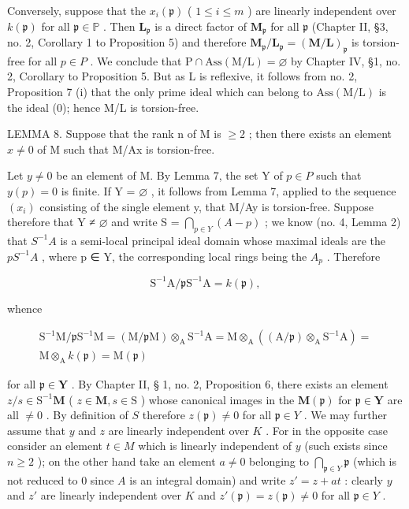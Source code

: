 Conversely, suppose that the \(x_{i}(\mathfrak{p})\) ( \(1 \leqslant i \leqslant m\) ) are linearly independent over \(k(\mathfrak{p})\) for all \(\mathfrak{p} \in \mathbb{P}\) . Then \(\mathbf{L}_{\mathfrak{p}}\) is a direct factor of \(\mathbf{M}_{\mathfrak{p}}\) for all \(\mathfrak{p}\) (Chapter II, §3, no. 2, Corollary 1 to Proposition 5) and therefore \(\mathbf{M}_{\mathfrak{p}} / \mathbf{L}_{\mathfrak{p}} = (\mathbf{M} / \mathbf{L})_{\mathfrak{p}}\) is torsion-free for all \(p \in P\) . We conclude that \(\mathrm{P} \cap \mathrm{Ass}(\mathrm{M}/\mathrm{L}) = \varnothing\) by Chapter IV, §1, no. 2, Corollary to Proposition 5. But as L is reflexive, it follows from no. 2, Proposition 7 (i) that the only prime ideal which can belong to \(\mathrm{Ass}(\mathrm{M}/\mathrm{L})\) is the ideal (0); hence M/L is torsion-free.

LEMMA 8. Suppose that the rank n of M is \(\geqslant2\) ; then there exists an element \(x \neq 0\) of M such that M/Ax is torsion-free.

Let \(y \neq 0\) be an element of M. By Lemma 7, the set Y of \(p \in P\) such that \(y(p) = 0\) is finite. If Y = \(\varnothing\) , it follows from Lemma 7, applied to the sequence \((x_i)\) consisting of the single element y, that M/Ay is torsion-free. Suppose therefore that Y ≠ \(\varnothing\) and write S = \(\bigcap_{p \in Y} (A - p)\) ; we know (no. 4, Lemma 2) that \(S^{-1}A\) is a semi-local principal ideal domain whose maximal ideals are the \(pS^{-1}A\) , where p ∈ Y, the corresponding local rings being the \(A_{p}\) . Therefore

\[
\mathrm{S} ^ {- 1} \mathrm{A} / \mathfrak {p} \mathrm{S} ^ {- 1} \mathrm{A} = k (\mathfrak {p}),
\]

whence

\[
\begin{array}{c} \mathrm{S} ^ {- 1} \mathrm{M} / \mathfrak {p} \mathrm{S} ^ {- 1} \mathrm{M} = (\mathrm{M} / \mathfrak {p} \mathrm{M}) \otimes_ {\mathrm{A}} \mathrm{S} ^ {- 1} \mathrm{A} = \mathrm{M} \otimes_ {\mathrm{A}} ((\mathrm{A} / \mathfrak {p}) \otimes_ {\mathrm{A}} \mathrm{S} ^ {- 1} \mathrm{A}) = \\ \mathrm{M} \otimes_ {\mathrm{A}} k (\mathfrak {p}) = \mathrm{M} (\mathfrak {p}) \end{array}
\]

for all \(\mathfrak{p} \in \mathbf{Y}\) . By Chapter II, § 1, no. 2, Proposition 6, there exists an element \(z / s \in \mathrm{S}^{-1}\mathbf{M}\) ( \(z \in \mathbf{M}, s \in \mathrm{S}\) ) whose canonical images in the \(\mathbf{M}(\mathfrak{p})\) for \(\mathfrak{p} \in \mathbf{Y}\) are all \(\neq 0\) . By definition of \(S\) therefore \(z(\mathfrak{p}) \neq 0\) for all \(\mathfrak{p} \in Y\) . We may further assume that \(y\) and \(z\) are linearly independent over \(K\) . For in the opposite case consider an element \(t \in M\) which is linearly independent of \(y\) (such exists since \(n \geqslant 2\) ); on the other hand take an element \(a \neq 0\) belonging to \(\bigcap_{\mathfrak{p} \in Y} \mathfrak{p}\) (which is not reduced to 0 since \(A\) is an integral domain) and write \(z' = z + at\) : clearly \(y\) and \(z'\) are linearly independent over \(K\) and \(z'(\mathfrak{p}) = z(\mathfrak{p}) \neq 0\) for all \(\mathfrak{p} \in Y\) .

